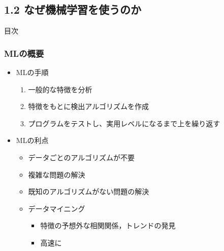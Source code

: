 \documentclass[aspectratio=169, dvipdfmx, 14pt, xcolor={svgnames,dvipsnames}]{beamer}
\def\tightlist{\itemsep1pt\parskip0pt\parsep0pt}
\begin{document}

\subsection{1.2
  なぜ機械学習を使うのか}\label{ux306aux305cux6a5fux68b0ux5b66ux7fd2ux3092ux4f7fux3046ux306eux304b}

\begin{frame}{目次}
  \tableofcontents[currentsubsection]
\end{frame}


\begin{frame}
  \frametitle{MLの概要}
  \begin{itemize}
    \tightlist
    \item
          MLの手順

          \begin{enumerate}
            \def\labelenumi{\arabic{enumi}.}
            \tightlist
            \item
                  一般的な特徴を分析
            \item
                  特徴をもとに検出アルゴリズムを作成
            \item
                  プログラムをテストし、実用レベルになるまで上を繰り返す
          \end{enumerate}
    \item
          MLの利点

          \begin{itemize}
            \tightlist
            \item
                  データごとのアルゴリズムが不要
            \item
                  複雑な問題の解決
            \item
                  既知のアルゴリズムがない問題の解決
            \item
                  データマイニング

                  \begin{itemize}
                    \tightlist
                    \item
                          特徴の予想外な相関関係，トレンドの発見

                    \item
                          高速に
                  \end{itemize}
          \end{itemize}
  \end{itemize}
\end{frame}
\end{document}

